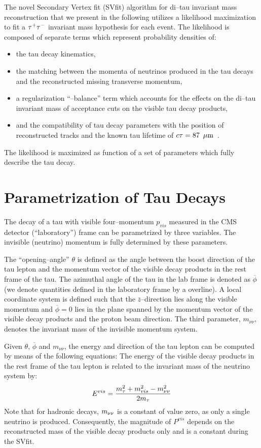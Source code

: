 The novel Secondary Vertex fit (SVfit) algorithm for di--tau invariant mass
reconstruction that we present in the following utilizes a likelihood
maximization to fit a $\tau^+\tau^-$ invariant mass hypothesis for each
event.  The likelihood is composed of separate terms which represent probability
densities of:
\begin{itemize}
\item the tau decay kinematics,
\item the matching between the momenta of neutrinos produced in the tau decays and
  the reconstructed missing transverse momentum,
\item a regularization ``\pt--balance'' term which accounts for the effects on the di--tau invariant mass
 of acceptance cuts on the visible tau decay products,
\item and the compatibility of tau decay parameters with the position of reconstructed tracks
 and the known tau lifetime of $c\tau = 87~\,\mu\text{m}$~\cite{PDG}.
\end{itemize}
The likelihood is maximized as function of a set of parameters which fully describe the tau decay.

\section{Parametrization of Tau Decays}
\label{sec:svParameterization}

The decay of a tau with visible four--momentum $p_{vis}$ measured in the CMS
detector (``laboratory'') frame can be parametrized by three variables.  The
invisible (neutrino) momentum is fully determined by these parameters.

The ``opening--angle'' $\theta$ is defined as the angle between the boost
direction of the tau lepton and the momentum vector of the visible decay
products in the rest frame of the tau.  The azimuthal angle of the tau in the
lab frame is denoted as $\overline{\phi}$ (we denote quantities defined in the
laboratory frame by a overline).  A local coordinate system is defined such that the
$\bar{z}$--direction lies along the visible momentum and $\overline{\phi} = 0$ lies
in the plane spanned by the momentum vector of the visible decay products and
the proton beam direction. The third parameter, $m_{\nu\nu}$, denotes the
invariant mass of the invisible momentum system.

Given $\theta$, $\overline{\phi}$ and $m_{\nu\nu}$, the energy and direction of the
tau lepton can be computed by means of the following equations: The energy of
the visible decay products in the rest frame of the tau lepton is related to the
invariant mass of the neutrino system by:
\begin{equation}
E^{vis} = \frac{m_\tau^2 + m_{vis}^2 - m_{\nu\nu}^2}{2m_\tau} 
\label{eq:restFrameMomentumRelation}
\end{equation}
Note that for hadronic decays, $m_{\nu\nu}$ is a constant of value zero, as only a
single neutrino is produced.  Consequently, the magnitude of $P^{vis}$ depends
on the reconstructed mass of the visible decay products only and is a constant
during the SVfit.

